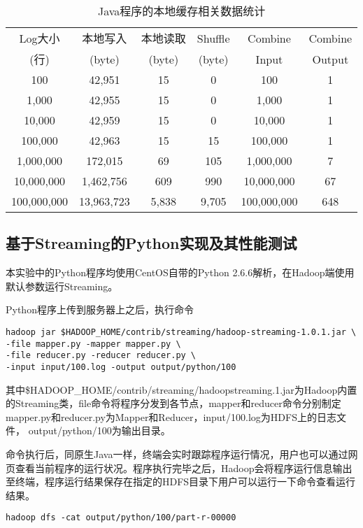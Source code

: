 \begin{table}[htbp]
 \caption{\label{tab:java}Java程序的本地缓存相关数据统计}
 \centering
 \begin{tabular}{cccccc}
  \toprule
  Log大小 & 本地写入 & 本地读取 & Shuffle & Combine & Combine\\
  (行) & (byte) & (byte) & (byte) &  Input & Output\\
  \midrule
  100 & 42,951 & 15 & 0 & 100 & 1\\
  1,000 & 42,955 & 15 & 0 & 1,000 & 1\\
  10,000 & 42,959 & 15 & 0 & 10,000 & 1\\
  100,000 & 42,963 & 15 & 15 & 100,000 & 1\\
  1,000,000 & 172,015 & 69 & 105 & 1,000,000 & 7\\
  10,000,000 & 1,462,756 & 609 & 990 & 10,000,000 & 67\\
  100,000,000 & 13,963,723 & 5,838 & 9,705 & 100,000,000 & 648\\
  \bottomrule
 \end{tabular}
\end{table}

\subsection{基于Streaming的Python实现及其性能测试}

本实验中的Python程序均使用CentOS自带的Python 2.6.6解析，在Hadoop端使用默认参数运行Streaming。

Python程序上传到服务器上之后，执行命令

\begin{verbatim}
hadoop jar $HADOOP_HOME/contrib/streaming/hadoop-streaming-1.0.1.jar \
-file mapper.py -mapper mapper.py \
-file reducer.py -reducer reducer.py \
-input input/100.log -output output/python/100
\end{verbatim}

其中\$HADOOP\_HOME/contrib/streaming/hadoop\-streaming.1.jar为Hadoop内置的Streaming类，\-file命令将程序分发到各节点，\-mapper和\-reducer命令分别制定mapper.py和reducer.py为Mapper和Reducer，input/100.log为HDFS上的日志文件， output/python/100为输出目录。

命令执行后，同原生Java一样，终端会实时跟踪程序运行情况，用户也可以通过网页查看当前程序的运行状况。程序执行完毕之后，Hadoop会将程序运行信息输出至终端，程序运行结果保存在指定的HDFS目录下用户可以运行一下命令查看运行结果。

\begin{verbatim}
hadoop dfs -cat output/python/100/part-r-00000
\end{verbatim}

